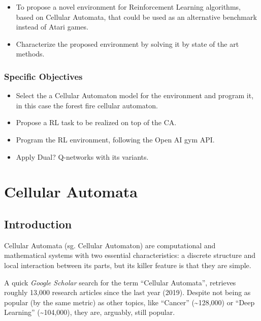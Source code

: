 \documentclass[
]{book}
\providecommand{\tightlist}{%
  \setlength{\itemsep}{0pt}\setlength{\parskip}{0pt}}
\begin{document}
\begin{itemize}
\tightlist
\item
  To propose a novel environment for Reinforcement Learning algorithms, based on Cellular Automata, that could be used as an alternative benchmark instead of Atari games.
\item
  Characterize the proposed environment by solving it by state of the art methods.
\end{itemize}

\hypertarget{specific-objectives}{%
\subsection{Specific Objectives}\label{specific-objectives}}

\begin{itemize}
\tightlist
\item
  Select the a Cellular Automaton model for the environment and program it, in this case the forest fire cellular automaton.
\item
  Propose a RL task to be realized on top of the CA.
\item
  Program the RL environment, following the Open AI gym API.
\item
  Apply Dual? Q-networks with its variants.
\end{itemize}

\hypertarget{cellular-automata}{%
\chapter{Cellular Automata}\label{cellular-automata}}

\hypertarget{introduction-1}{%
\section{Introduction}\label{introduction-1}}

Cellular Automata (sg. Cellular Automaton) are computational and mathematical systems with two essential characteristics: a discrete structure and local interaction between its parts, but its killer feature is that they are simple.

A quick \emph{Google Scholar} search for the term ``Cellular Automata'', retrieves roughly 13,000 research articles since the last year (2019). Despite not being as popular (by the same metric) as other topics, like ``Cancer'' (\textasciitilde128,000) or ``Deep Learning'' (\textasciitilde104,000), they are, arguably, still popular.
\end{document}
